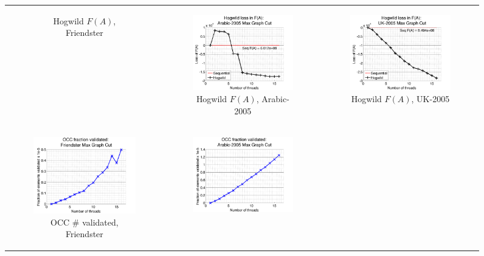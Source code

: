 \begin{figure}[ht]
\begin{tabular}{ccc}
\begin{subfigure}[b]{0.31\textwidth}
			\caption{Hogwild $F(A)$, Friendster}
			\label{appfig:diffFA_Hogwild_friendster10M_maxgraphcut}
	  \end{subfigure} &
	  \begin{subfigure}[b]{0.31\textwidth}
	  	\includegraphics[width=150pt]{images/diffFA_Hogwild_arabic2005_maxgraphcut.png}
			\caption{Hogwild $F(A)$, Arabic-2005}
			\label{appfig:diffFA_Hogwild_arabic2005_maxgraphcut}
	  \end{subfigure} &
	  \begin{subfigure}[b]{0.31\textwidth}
	  	\includegraphics[width=150pt]{images/diffFA_Hogwild_uk2005_maxgraphcut.png}
			\caption{Hogwild $F(A)$, UK-2005}
			\label{appfig:diffFA_Hogwild_uk2005_maxgraphcut}
	  \end{subfigure} \\
	  \begin{subfigure}[b]{0.31\textwidth}
	  	\includegraphics[width=150pt]{images/validated_OCC_friendster10M_maxgraphcut.png}
			\caption{OCC \# validated, Friendster}
			\label{appfig:validated_OCC_friendster10M_maxgraphcut}
	  \end{subfigure} &
	  \begin{subfigure}[b]{0.31\textwidth}
	  	\includegraphics[width=150pt]{images/validated_OCC_arabic2005_maxgraphcut.png}

\end{subfigure}
\end{tabular}
\end{figure}
